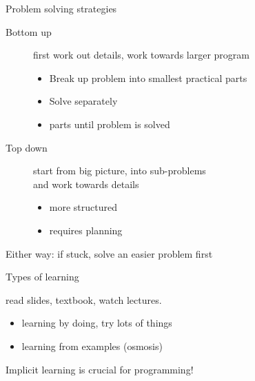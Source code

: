 \documentclass[aspectratio=169,usenames,dvipsnames]{beamer}
\begin{document}
\begin{frame}{Problem solving strategies}
    \begin{description}
        \item[Bottom up] first work out details, work towards larger program
            \begin{itemize}
                \item Break up problem into smallest practical parts
                \item Solve separately
                \item {} parts until problem is solved
            \end{itemize}
        \item[Top down] start from big picture,  into sub-problems \\
            and work towards details
            \begin{itemize}
                \item more structured
                \item requires planning
            \end{itemize}
    \end{description}

    \vspace{1em}
    Either way: if stuck, solve an easier problem first
\end{frame}

\begin{frame}{Types of learning}
    \begin{description}
        \item[Explicit learning]
            read slides, textbook, watch lectures.
        \item[Implicit learning]
            \begin{itemize}
                \item learning by doing, try lots of things
                \item learning from examples (osmosis)
            \end{itemize}
    \end{description}

    \vspace{1em}
    Implicit learning is crucial for programming!
\end{frame}
\end{document}
